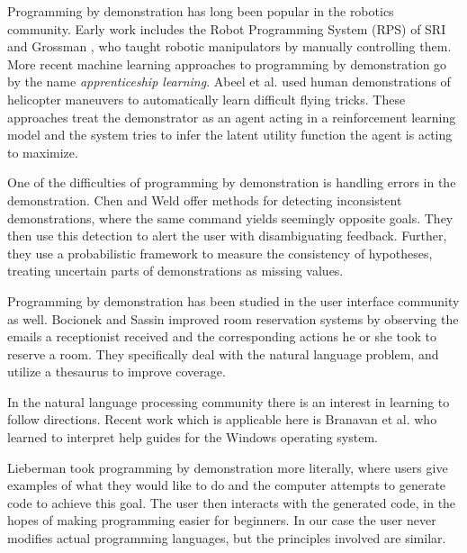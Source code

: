 \documentclass[letterpaper]{article}
\begin{document}
Programming by demonstration has long been popular in the robotics community.
Early work includes the Robot Programming System (RPS) of SRI \cite{SRIpbd} and
Grossman \cite{grossman}, who taught robotic manipulators by manually controlling them.
More recent machine learning approaches to programming by demonstration 
go by the name \emph{apprenticeship learning}.
Abeel et al. \cite{Abbeel:2004:ALV:1015330.1015430} used human demonstrations of helicopter maneuvers to automatically learn difficult flying tricks. These approaches treat the demonstrator as an agent
acting in a reinforcement learning model and the system tries to infer the latent utility function
the agent is acting to maximize.

One of the difficulties of programming by demonstration is handling errors in 
the demonstration. Chen and Weld \cite{Chen:2008:RED:1378773.1378794} offer methods for
detecting inconsistent demonstrations, where the same command yields seemingly opposite
goals. They then use this detection to alert the user with disambiguating feedback.
Further, they use a probabilistic framework to measure the consistency of hypotheses,
treating uncertain parts of demonstrations as missing values.

Programming by demonstration has been studied in the user interface community as well.
Bocionek and Sassin \cite{Bocionek:1993:DLA:865219} improved room reservation systems
by observing the emails a receptionist received and the corresponding actions
he or she took to reserve a room. They specifically deal with the natural language problem,
and utilize a thesaurus to improve coverage.

In the natural language processing community there is an interest in learning to 
follow directions. Recent work which is applicable here is Branavan et al. 
\cite{DBLP:conf/acl/BranavanCZB09} who learned to interpret help guides for the 
Windows operating system. 

Lieberman \cite{lieberman2001} took programming by demonstration more literally, where users give examples
of what they would like to do and the computer attempts to generate code to 
achieve this goal. The user then interacts with the generated code, in the hopes
of making programming easier for beginners. In our case the user never 
modifies actual programming languages, but the principles involved are similar.
\end{document}
